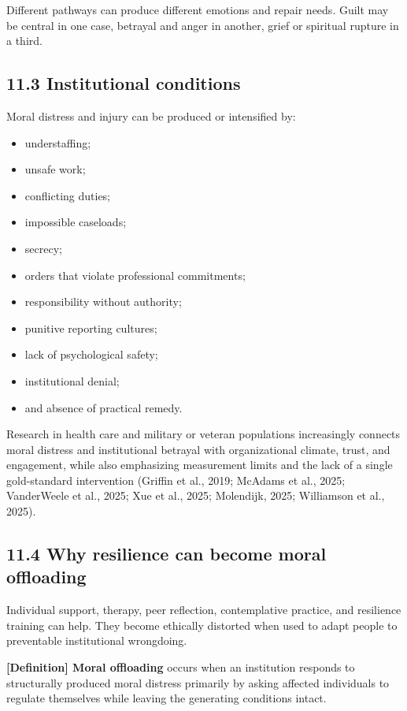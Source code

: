 \documentclass[
  11pt,
]{article}
\providecommand{\tightlist}{%
  \setlength{\itemsep}{0pt}\setlength{\parskip}{0pt}}
\begin{document}
Different pathways can produce different emotions and repair needs.
Guilt may be central in one case, betrayal and anger in another, grief
or spiritual rupture in a third.

\subsection{11.3 Institutional
conditions}\label{institutional-conditions}

Moral distress and injury can be produced or intensified by:

\begin{itemize}
\tightlist
\item
  understaffing;
\item
  unsafe work;
\item
  conflicting duties;
\item
  impossible caseloads;
\item
  secrecy;
\item
  orders that violate professional commitments;
\item
  responsibility without authority;
\item
  punitive reporting cultures;
\item
  lack of psychological safety;
\item
  institutional denial;
\item
  and absence of practical remedy.
\end{itemize}

Research in health care and military or veteran populations increasingly
connects moral distress and institutional betrayal with organizational
climate, trust, and engagement, while also emphasizing measurement
limits and the lack of a single gold-standard intervention (Griffin et
al., 2019; McAdams et al., 2025; VanderWeele et al., 2025; Xue et al.,
2025; Molendijk, 2025; Williamson et al., 2025).

\subsection{11.4 Why resilience can become moral
offloading}\label{why-resilience-can-become-moral-offloading}

Individual support, therapy, peer reflection, contemplative practice,
and resilience training can help. They become ethically distorted when
used to adapt people to preventable institutional wrongdoing.

\textbf{{[}Definition{]} Moral offloading} occurs when an institution
responds to structurally produced moral distress primarily by asking
affected individuals to regulate themselves while leaving the generating
conditions intact.
\end{document}
